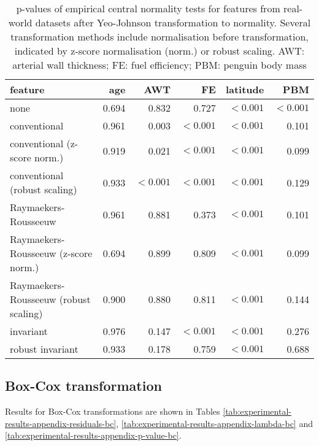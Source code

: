 \documentclass[
  a4paper,
]{article}
\begin{document}
\begin{table}
\begin{center}
\caption{
p-values of empirical central normality tests for features from real-world datasets after Yeo-Johnson transformation to normality.
Several transformation methods include normalisation before transformation, indicated by z-score normalisation (norm.) or robust scaling. 
AWT: arterial wall thickness; FE: fuel efficiency; PBM: penguin body mass}
\label{tab:experimental-results-appendix-p-value}
\begin{tabular}{l | r r r r r}

\toprule
feature & age & AWT & FE & latitude & PBM \\

\midrule

none                                  & 0.694 & 0.832     & 0.727     & $< 0.001$ & $< 0.001$ \\
conventional                          & 0.961 & 0.003     & $< 0.001$ & $< 0.001$ & 0.101 \\
conventional (z-score norm.)          & 0.919 & 0.021     & $< 0.001$ & $< 0.001$ & 0.099 \\
conventional (robust scaling)         & 0.933 & $< 0.001$ & $< 0.001$ & $< 0.001$ & 0.129 \\
Raymaekers-Rousseeuw                  & 0.961 & 0.881     & 0.373     & $< 0.001$ & 0.101 \\
Raymaekers-Rousseeuw (z-score norm.)  & 0.694 & 0.899     & 0.809     & $< 0.001$ & 0.099 \\
Raymaekers-Rousseeuw (robust scaling) & 0.900 & 0.880     & 0.811     & $< 0.001$ & 0.144 \\
invariant                             & 0.976 & 0.147     & $< 0.001$ & $< 0.001$ & 0.276 \\
robust invariant                      & 0.933 & 0.178     & 0.759     & $< 0.001$ & 0.688 \\

\bottomrule
\end{tabular}
\end{center}
\end{table}

\FloatBarrier

\subsection{Box-Cox transformation}\label{box-cox-transformation}

Results for Box-Cox transformations are shown in Tables
\ref{tab:experimental-results-appendix-residuals-bc},
\ref{tab:experimental-results-appendix-lambda-bc} and
\ref{tab:experimental-results-appendix-p-value-bc}.
\end{document}
